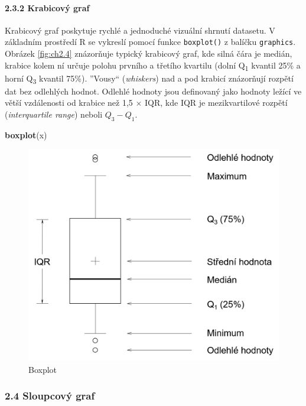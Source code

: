 \documentclass[12pt,]{article}
\newenvironment{Shaded}{\begin{snugshade}}{\end{snugshade}}
\newcommand{\KeywordTok}[1]{\textcolor[rgb]{0.13,0.29,0.53}{\textbf{#1}}}
\newcommand{\NormalTok}[1]{#1}
\let\oldparagraph\paragraph
\renewcommand{\paragraph}[1]{\oldparagraph{#1}\mbox{}}
\begin{document}
\newpage

\hypertarget{boxplot}{\paragraph{2.3.2 Krabicový graf}\label{boxplot}}

\qquad Krabicový graf poskytuje rychlé a jednoduché vizuální shrnutí
datasetu. V základním prostředí R se vykreslí pomocí funkce
\texttt{boxplot()} z balíčku \texttt{graphics}. Obrázek \ref{fig:ch2.4}
znázorňuje typický krabicový graf, kde silná čára je medián, krabice
kolem ní určuje polohu prvního a třetího kvartilu (dolní
Q\textsubscript{1} kvantil 25\% a horní Q\textsubscript{3} kvantil
75\%). ''Vousy`` (\emph{whiskers}) nad a pod krabicí znázorňují rozpětí
dat bez odlehlých hodnot. Odlehlé hodnoty jsou definovaný jako hodnoty
ležící ve větší vzdálenosti od krabice než 1,5 \(\times\) IQR, kde IQR
je mezikvartilové rozpětí (\emph{interquartile range}) neboli
\(Q_3 - Q_1\).

\begin{Shaded}
\begin{Highlighting}[]
\KeywordTok{boxplot}\NormalTok{(x)}
\end{Highlighting}
\end{Shaded}

\begin{figure}[H]

{\centering \includegraphics[width=0.65\linewidth]{fig/boxplot} 

}

\caption{\label{fig:ch2.4} Boxplot}\label{fig:boxplot_img}
\end{figure}

\newpage

\subsubsection{2.4 Sloupcový graf}\label{sloupcovy-graf}
\end{document}
